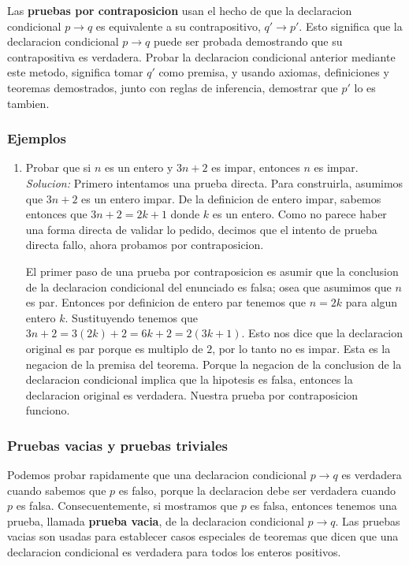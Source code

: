 \documentclass[]{article}
\begin{document}
Las \textbf{pruebas por contraposicion} usan el hecho de que la declaracion condicional $p \rightarrow q$ es equivalente a su contrapositivo, $q' \rightarrow p'$. Esto significa que la declaracion condicional $p \rightarrow q$ puede ser probada demostrando que su contrapositiva es verdadera. Probar la declaracion condicional anterior mediante este metodo, significa tomar $q'$ como premisa, y usando axiomas, definiciones y teoremas demostrados, junto con reglas de inferencia, demostrar que $p'$ lo es tambien.

\subsubsection*{Ejemplos}

\begin{enumerate}
	\item Probar que si $n$ es un entero y $3n + 2$ es impar, entonces $n$ es impar.\\
	\textit{Solucion:} Primero intentamos una prueba directa. Para construirla, asumimos que $3n + 2$ es un entero impar. De la definicion de entero impar, sabemos entonces que $3n + 2 = 2k + 1$ donde $k$ es un entero. Como no parece haber una forma directa de validar lo pedido, decimos que el intento de prueba directa fallo, ahora probamos por contraposicion.

	El primer paso de una prueba por contraposicion es asumir que la conclusion de la declaracion condicional del enunciado es falsa; osea que asumimos que $n$ es par. Entonces por definicion de entero par tenemos que $n = 2k$ para algun entero $k$. Sustituyendo tenemos que $3n + 2 = 3(2k) + 2 = 6k + 2 = 2(3k + 1)$. Esto nos dice que la declaracion original es par porque es multiplo de $2$, por lo tanto no es impar. Esta es la negacion de la premisa del teorema. Porque la negacion de la conclusion de la declaracion condicional implica que la hipotesis es falsa, entonces la declaracion original es verdadera. Nuestra prueba por contraposicion funciono.
\end{enumerate}

\subsubsection{Pruebas vacias y pruebas triviales}

Podemos probar rapidamente que una declaracion condicional $p \rightarrow q$ es verdadera cuando sabemos que $p$ es falso, porque la declaracion debe ser verdadera cuando $p$ es falsa. Consecuentemente, si mostramos que $p$ es falsa, entonces tenemos una prueba, llamada \textbf{prueba vacia}, de la declaracion condicional $p \rightarrow q$. Las pruebas vacias son usadas para establecer casos especiales de teoremas que dicen que una declaracion condicional es verdadera para todos los enteros positivos. 
\end{document}
